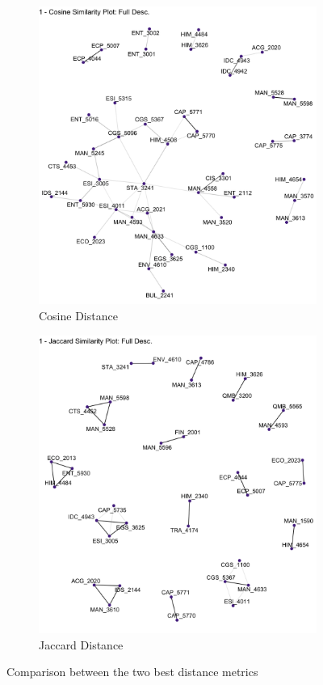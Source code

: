 \begin{figure}[H]
\centering
\begin{subfigure}{.5\textwidth}
  \centering
  \includegraphics[width=1\linewidth]{Content/images/cos.png}
  \caption{Cosine Distance}
  \label{fig:cos}
\end{subfigure}%
\begin{subfigure}{.5\textwidth}
  \centering
  \includegraphics[width=1\linewidth]{Content/images/jac.png}
  \caption{Jaccard Distance}
  \label{fig:jac}
\end{subfigure}
\caption{Comparison between the two best distance metrics}
\label{fig:tile}
\end{figure}

